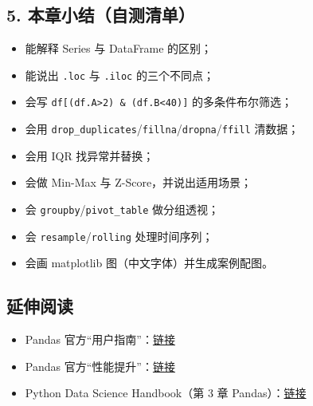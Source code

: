\subsection{5.
本章小结（自测清单）}\label{ux672cux7ae0ux5c0fux7ed3ux81eaux6d4bux6e05ux5355}

\begin{itemize}
\tightlist
\item[$\square$]
  能解释 Series 与 DataFrame 的区别；
\item[$\square$]
  能说出 \texttt{.loc} 与 \texttt{.iloc} 的三个不同点；
\item[$\square$]
  会写 \texttt{df{[}(df.A\textgreater{}2)\ \&\ (df.B\textless{}40){]}}
  的多条件布尔筛选；
\item[$\square$]
  会用
  \texttt{drop\_duplicates}/\texttt{fillna}/\texttt{dropna}/\texttt{ffill}
  清数据；
\item[$\square$]
  会用 IQR 找异常并替换；
\item[$\square$]
  会做 Min-Max 与 Z-Score，并说出适用场景；
\item[$\square$]
  会 \texttt{groupby}/\texttt{pivot\_table} 做分组透视；
\item[$\square$]
  会 \texttt{resample}/\texttt{rolling} 处理时间序列；
\item[$\square$]
  会画 matplotlib 图（中文字体）并生成案例配图。
\end{itemize}

\subsection{延伸阅读}\label{ux5ef6ux4f38ux9605ux8bfb-20}

\begin{itemize}
\tightlist
\item
  Pandas
  官方``用户指南''：\href{https://pandas.pydata.org/docs/user_guide/index.html}{链接}
\item
  Pandas
  官方``性能提升''：\href{https://pandas.pydata.org/docs/user_guide/enhancingperf.html}{链接}
\item
  Python Data Science Handbook（第 3 章
  Pandas）：\href{https://github.com/jakevdp/PythonDataScienceHandbook}{链接}
\end{itemize}

\newpage
